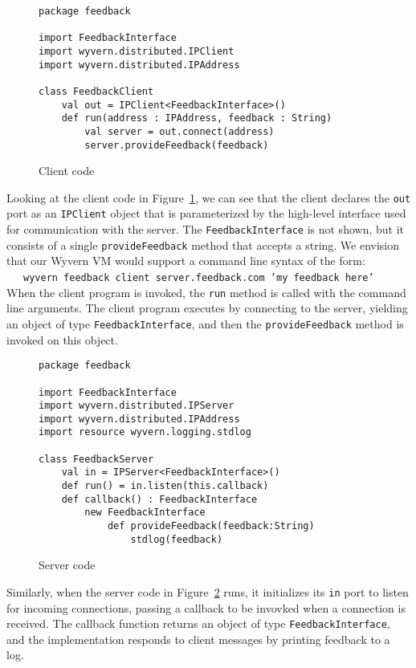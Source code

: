 \documentclass[runningheads]{llncs}
\begin{document}
\begin{sloppypar}
\begin{figure}[t]
\begin{lstlisting}
package feedback

import FeedbackInterface
import wyvern.distributed.IPClient
import wyvern.distributed.IPAddress

class FeedbackClient
    val out = IPClient<FeedbackInterface>()
    def run(address : IPAddress, feedback : String)
        val server = out.connect(address)
        server.provideFeedback(feedback)
\end{lstlisting}
\caption{Client code}
\label{f-client}
\end{figure}


Looking at the client code in Figure~\ref{f-client}, we can see that the client declares the \texttt{out} port as an \texttt{IPClient} object that is parameterized by the high-level interface used for communication with the server.  The \texttt{FeedbackInterface} is not shown, but it consists of a single \texttt{provideFeedback} method that accepts a string.  We envision that our Wyvern VM would support a command line syntax of the form:\\
~~~\texttt{wyvern feedback client server.feedback.com 'my feedback here'}\\
When the client program is invoked, the \texttt{run} method is called with the command line arguments.  The client program executes by connecting to the server, yielding an object of type \texttt{FeedbackInterface}, and then the \texttt{provideFeedback} method is invoked on this object.


\begin{figure}[t]
\begin{lstlisting}
package feedback

import FeedbackInterface
import wyvern.distributed.IPServer
import wyvern.distributed.IPAddress
import resource wyvern.logging.stdlog

class FeedbackServer
    val in = IPServer<FeedbackInterface>()
    def run() = in.listen(this.callback)
    def callback() : FeedbackInterface
        new FeedbackInterface
            def provideFeedback(feedback:String)
                stdlog(feedback)

\end{lstlisting}
\caption{Server code}
\label{f-server}
\end{figure}


Similarly, when the server code in Figure~\ref{f-server} runs, it initializes its \texttt{in} port to listen for incoming connections, passing a callback to be invovked when a connection is received.  The callback function returns an object of type \texttt{FeedbackInterface}, and the implementation responds to client messages by printing feedback to a log.


\end{sloppypar}
\end{document}
